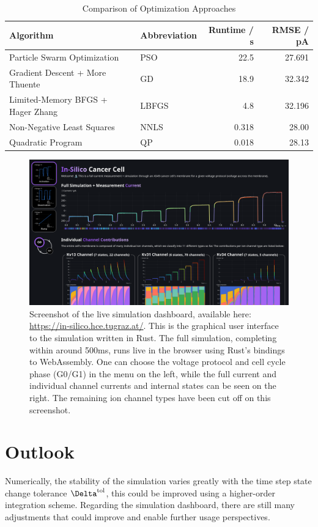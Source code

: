 \begin{table}[ht]
  \centering
  \caption{Comparison of Optimization Approaches}
  \begin{tabular}{llrr}
    \textbf{Algorithm}                          & \textbf{Abbreviation} & \textbf{Runtime} / s & \textbf{RMSE} / pA \\
    \midrule
    Particle Swarm Optimization                 & PSO                   & 22.5                 & 27.691             \\
    Gradient Descent + More Thuente             & GD                    & 18.9                 & 32.342             \\
    Limited-Memory BFGS + Hager Zhang           & LBFGS                 & 4.8                  & 32.196             \\
    Non-Negative Least Squares \cite{1997-nnls} & NNLS                  & 0.318                & 28.00              \\
    Quadratic Program                           & QP                    & 0.018                & 28.13              \\
  \end{tabular}
  \label{table:optimization-comparison}
\end{table}

\begin{figure}[ht]
  \includegraphics[width=\textwidth]{../figures/above-the-fold-screenshot.png}
  \caption{Screenshot of the live simulation dashboard, available here: \url{https://in-silico.hce.tugraz.at/}. This is the graphical user interface to the simulation written in Rust. The full simulation, completing within around 500ms, runs live in the browser using Rust's bindings to WebAssembly. One can choose the voltage protocol and cell cycle phase (G0/G1) in the menu on the left, while the full current and individual channel currents and internal states can be seen on the right. The remaining ion channel types have been cut off on this screenshot.}
  \label{figure:screenshot}
\end{figure}

\section{Outlook}
Numerically, the stability of the simulation varies greatly with the time step state change tolerance $\Delta^{\rm tol}$, this could be improved using a higher-order integration scheme.
Regarding the simulation dashboard, there are still many adjustments that could improve and enable further usage perspectives.
